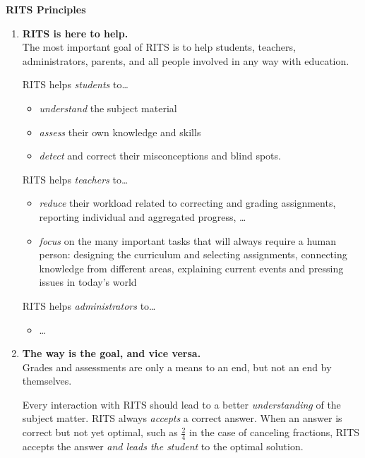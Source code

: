 \documentclass[a4paper,11pt]{article}
\begin{document}
\noindent
\begin{center}
\Large\textbf{RITS Principles}
\end{center}

\vspace{1cm}

\begin{enumerate}
\item \textbf{RITS is here to help.}\\
  The most important goal of RITS is to help students, teachers,
  administrators, parents, and all people involved in any way with
  education.

  \bigskip\noindent
  RITS helps \textit{students} to\dots
  \begin{itemize}
  \item \textit{understand} the subject material
  \item \textit{assess} their own knowledge and skills
  \item \textit{detect} and correct their misconceptions and blind spots.
  \end{itemize}

  \bigskip\noindent
  RITS helps \textit{teachers} to\dots
  \begin{itemize}
  \item \textit{reduce} their workload related to correcting and grading
    assignments, reporting individual and aggregated progress, \dots
  \item \textit{focus} on the many important tasks that will always require a
    human person: designing the curriculum and selecting assignments,
    connecting knowledge from different areas, explaining current
    events and pressing issues in today's world
  \end{itemize}
  \bigskip\noindent
  
  RITS helps \textit{administrators} to\dots
  \begin{itemize}
  \item \dots
  \end{itemize}

\item \textbf{The way is the goal, and vice versa.}\\
  Grades and assessments are only a means to an end, but not an end by
  themselves.

  Every interaction with RITS should lead to a better
  \textit{understanding} of the subject matter. RITS always
  \textit{accepts} a correct answer. When an answer is correct but not
  yet optimal, such as $\frac{2}{4}$ in the case of canceling
  fractions, RITS accepts the answer \textit{and leads the student} to
  the optimal solution.



\end{enumerate}
\end{document}
